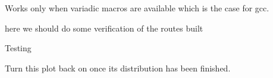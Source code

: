 
\begin{DoxyRefList}
\item[\label{todo__todo000148}%
\hypertarget{todo__todo000148}{}%
Member \hyperlink{buffer-test_8cc_adb8db1b0f6eec9da1f9f6d8b9f1e4ba8}{E\+N\+S\+U\+R\+E\+\_\+\+W\+R\+I\+T\+T\+E\+N\+\_\+\+B\+Y\+T\+ES} (buffer, n,...)]Works only when variadic macros are available which is the case for gcc.  
\item[\label{todo__todo000067}%
\hypertarget{todo__todo000067}{}%
Member \hyperlink{classGlobalRouteManagerImplTestCase_aed56fd8ecbd7ecaa5473b9793d0befc1}{Global\+Route\+Manager\+Impl\+Test\+Case\+:\+:Do\+Run} (void)]here we should do some verification of the routes built 

Testing  
\item[\label{todo__todo000002}%
\hypertarget{todo__todo000002}{}%
Member \hyperlink{main-random-variable-stream_8cc_a0ddf1224851353fc92bfbff6f499fa97}{main} (int argc, char $\ast$argv\mbox{[}\mbox{]})]Turn this plot back on once its distribution has been finished. 


\end{DoxyRefList}
